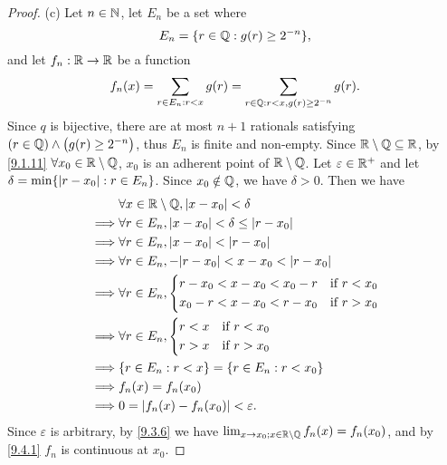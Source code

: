 \begin{proof}{(c)}
  Let \(n \in \mathbb{N}\), let \(E_n\) be a set where
  \[
    E_n = \{r \in \mathbb{Q} : g(r) \geq 2^{-n}\},
  \]
  and let \(f_n : \mathbb{R} \to \mathbb{R}\) be a function
  \[
    f_n(x) = \sum_{r \in E_n : r < x} g(r) = \sum_{r \in \mathbb{Q} : r < x, g(r) \geq 2^{-n}} g(r).
  \]
  Since \(q\) is bijective, there are at most \(n + 1\) rationals satisfying \((r \in \mathbb{Q}) \land \big(g(r) \geq 2^{-n}\big)\), thus \(E_n\) is finite and non-empty.
  Since \(\mathbb{R} \setminus \mathbb{Q} \subseteq \mathbb{R}\), by \cref{9.1.11} \(\forall x_0 \in \mathbb{R} \setminus \mathbb{Q}\), \(x_0\) is an adherent point of \(\mathbb{R} \setminus \mathbb{Q}\).
  Let \(\varepsilon \in \mathbb{R}^+\) and let \(\delta = \min\{\left\lvert r - x_0\right\rvert : r \in E_n\}\).
  Since \(x_0 \notin \mathbb{Q}\), we have \(\delta > 0\).
  Then we have
  \begin{align*}
             & \forall x \in \R \setminus \Q, \abs{x - x_0} < \delta               \\
    \implies & \forall r \in E_n, \abs{x - x_0} < \delta \leq \abs{r - x_0}        \\
    \implies & \forall r \in E_n, \abs{x - x_0} < \abs{r - x_0}                    \\
    \implies & \forall r \in E_n, -\abs{r - x_0} < x - x_0 < \abs{r - x_0}         \\
    \implies & \forall r \in E_n, \begin{dcases}
                                    r - x_0 < x - x_0 < x_0 - r & \text{if } r < x_0 \\
                                    x_0 - r < x - x_0 < r - x_0 & \text{if } r > x_0
                                  \end{dcases} \\
    \implies & \forall r \in E_n, \begin{dcases}
                                    r < x & \text{if } r < x_0 \\
                                    r > x & \text{if } r > x_0
                                  \end{dcases}                       \\
    \implies & \{r \in E_n : r < x\} = \{r \in E_n : r < x_0\}                     \\
    \implies & f_n(x) = f_n(x_0)                                                   \\
    \implies & 0 = \abs{f_n(x) - f_n(x_0)} < \varepsilon.
  \end{align*}
  Since \(\varepsilon\) is arbitrary, by \cref{9.3.6} we have \(\lim_{x \to x_0 ; x \in \mathbb{R} \setminus \mathbb{Q}} f_n(x) = f_n(x_0)\), and by \cref{9.4.1} \(f_n\) is continuous at \(x_0\).


\end{proof}

